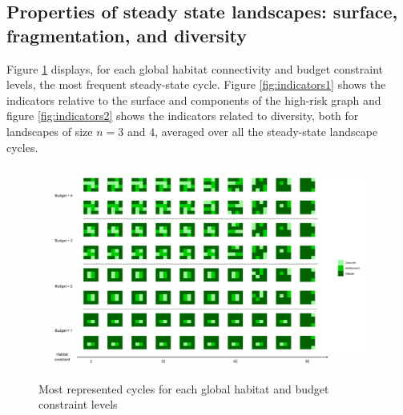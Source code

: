 \subsection{Properties of steady state landscapes: surface, fragmentation, and diversity}
\label{sec:landscape_char}

Figure \ref{fig:cycles} displays, for each global habitat connectivity and budget constraint levels, the most frequent steady-state cycle.
Figure \ref{fig:indicators1} shows the indicators relative to the surface and components of the high-risk graph and figure \ref{fig:indicators2} shows the indicators related to diversity, both for landscapes of size $n=3$ and $4$, averaged over all the steady-state landscape cycles. 


\begin{figure}[H]
    \centering
    \includegraphics[width=\textwidth]{figures/wildland/full_cycle_canva.jpg}
    \caption{Most represented cycles for each global habitat and budget  constraint levels}
    \label{fig:cycles}
\end{figure}


